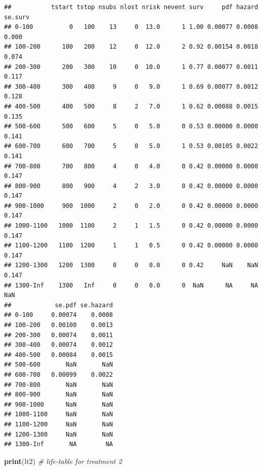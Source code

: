 \documentclass[
]{article}
\newenvironment{Shaded}{\begin{snugshade}}{\end{snugshade}}
\newcommand{\CommentTok}[1]{\textcolor[rgb]{0.56,0.35,0.01}{\textit{#1}}}
\newcommand{\FunctionTok}[1]{\textcolor[rgb]{0.13,0.29,0.53}{\textbf{#1}}}
\newcommand{\NormalTok}[1]{#1}
\begin{document}
\begin{verbatim}
##           tstart tstop nsubs nlost nrisk nevent surv     pdf hazard se.surv
## 0-100          0   100    13     0  13.0      1 1.00 0.00077 0.0008   0.000
## 100-200      100   200    12     0  12.0      2 0.92 0.00154 0.0018   0.074
## 200-300      200   300    10     0  10.0      1 0.77 0.00077 0.0011   0.117
## 300-400      300   400     9     0   9.0      1 0.69 0.00077 0.0012   0.128
## 400-500      400   500     8     2   7.0      1 0.62 0.00088 0.0015   0.135
## 500-600      500   600     5     0   5.0      0 0.53 0.00000 0.0000   0.141
## 600-700      600   700     5     0   5.0      1 0.53 0.00105 0.0022   0.141
## 700-800      700   800     4     0   4.0      0 0.42 0.00000 0.0000   0.147
## 800-900      800   900     4     2   3.0      0 0.42 0.00000 0.0000   0.147
## 900-1000     900  1000     2     0   2.0      0 0.42 0.00000 0.0000   0.147
## 1000-1100   1000  1100     2     1   1.5      0 0.42 0.00000 0.0000   0.147
## 1100-1200   1100  1200     1     1   0.5      0 0.42 0.00000 0.0000   0.147
## 1200-1300   1200  1300     0     0   0.0      0 0.42     NaN    NaN   0.147
## 1300-Inf    1300   Inf     0     0   0.0      0  NaN      NA     NA     NaN
##            se.pdf se.hazard
## 0-100     0.00074    0.0008
## 100-200   0.00100    0.0013
## 200-300   0.00074    0.0011
## 300-400   0.00074    0.0012
## 400-500   0.00084    0.0015
## 500-600       NaN       NaN
## 600-700   0.00099    0.0022
## 700-800       NaN       NaN
## 800-900       NaN       NaN
## 900-1000      NaN       NaN
## 1000-1100     NaN       NaN
## 1100-1200     NaN       NaN
## 1200-1300     NaN       NaN
## 1300-Inf       NA        NA
\end{verbatim}

\begin{Shaded}
\begin{Highlighting}[]
\FunctionTok{print}\NormalTok{(lt2) }\CommentTok{\# life{-}table for treatment 2}
\end{Highlighting}
\end{Shaded}
\end{document}

